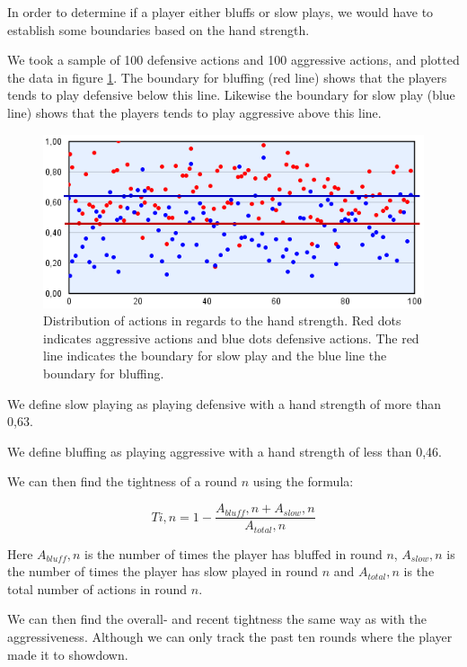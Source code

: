 In order to determine if a player either bluffs or slow plays, we would have to establish some boundaries based on the hand strength. 

We took a sample of 100 defensive actions and 100 aggressive actions, and plotted the data in figure \ref{fig:dist-act}. The boundary for bluffing (red line) shows that the players tends to play defensive below this line. Likewise the boundary for slow play (blue line) shows that the players tends to play aggressive above this line.

\begin{figure}[H]
  \center
    \includegraphics[scale=0.775]{images/modeling/action-dist.png}
  \caption{Distribution of actions in regards to the hand strength. Red dots indicates aggressive actions and blue dots defensive actions. The red line indicates the boundary for slow play and the blue line the boundary for bluffing. \label{fig:dist-act}}
\end{figure}

We define slow playing as playing defensive with a hand strength of more than 0,63.

We define bluffing as playing aggressive with a hand strength of less than 0,46.

We can then find the tightness of a round $n$ using the formula:

\[Ti,n = 1 - \frac{A_{bluff},n + A_{slow},n}{A_{total},n}\]

Here $A_{bluff},n$ is the number of times the player has bluffed in round $n$, $A_{slow},n$ is the number of times the player has slow played in round $n$ and $A_{total},n$ is the total number of actions in round $n$.

We can then find the overall- and recent tightness the same way as with the aggressiveness. Although we can only track the past ten rounds where the player made it to showdown.\\

